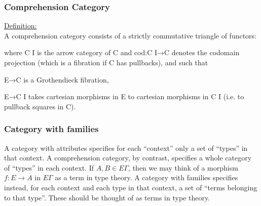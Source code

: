 \documentclass[aspectratio=169]{beamer}
\begin{document}
    \begin{frame}
        \frametitle{Comprehension Category}
        \underline{Definition:}\\
        A comprehension category consists of a strictly commutative triangle of functors:
        \begin{center}
        \end{center}
        where C I is the arrow category of C and cod:C I→C denotes the codomain projection (which is a fibration if C has pullbacks), and such that

    E→C is a Grothendieck fibration,

    E→C I takes cartesian morphisms in E to cartesian morphisms in C I (i.e. to pullback squares in C).
    \end{frame}
    \begin{frame}
        \frametitle{Category with families}
        A category with attributes specifies for each “context” only a set of “types” in that context. A comprehension category, by contrast, specifies a whole category of “types” in each context. If $A,B \in E \Gamma$, then we may think of a morphism $f:E\to A$ in $E \Gamma$ as a term in type theory.
        A category with families specifies instead, for each context and each type in that context, a set of “terms belonging to that type”. These should be thought of as terms in type theory.
    \end{frame}
\end{document}
